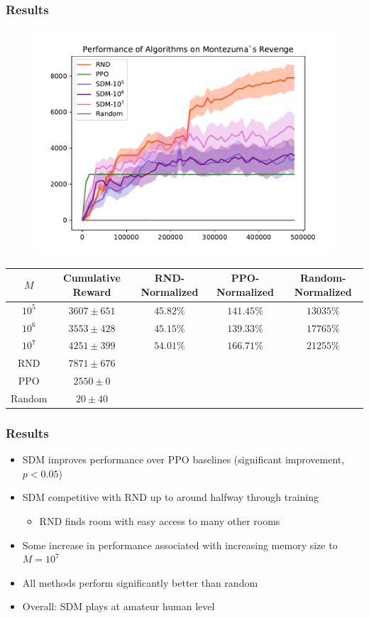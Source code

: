 \documentclass{beamer}
\begin{document}
\begin{frame}
  \frametitle{Results}
  \begin{figure}
    \includegraphics[scale=0.4]{assets/training-curve.pdf}
  \end{figure}
  \begin{table}
    \tiny
  \begin{tabular}{c |c c c c}
    $M$ & Cumulative Reward & RND-Normalized & PPO-Normalized & Random-Normalized \\ \hline
    $10^5$ & $3607 \pm 651$ & $45.82\%$ & $141.45\%$ & $13035\%$\\
    $10^6$ & $3553 \pm 428$ & $45.15\%$ & $139.33\%$ & $17765\%$\\
    $10^7$ & $4251 \pm 399$ & $54.01\%$ & $166.71\%$ & $21255\%$\\
    \hline
    RND & $7871 \pm 676$ & & & \\
    PPO & $2550 \pm 0$ & & & \\
    Random & $20 \pm 40$ & & & \\

  \end{tabular}
\end{table}
\end{frame}

\begin{frame}
  \frametitle{Results}
  \begin{itemize}
    \item SDM improves performance over PPO baselines (significant improvement, $p<0.05$)
    \item SDM competitive with RND up to around halfway through training
    \begin{itemize}
      \item RND finds room with easy access to many other rooms
    \end{itemize}
    \item Some increase in performance associated with increasing memory size to $M=10^7$
    \item All methods perform significantly better than random
    \item Overall: SDM plays at amateur human level
  \end{itemize}
\end{frame}
\end{document}
